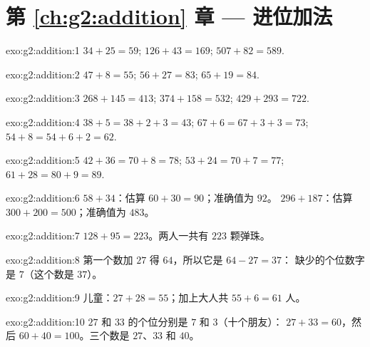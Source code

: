\section*{第 \ref{ch:g2:addition} 章 --- 进位加法}

\begin{solution}{exo:g2:addition:1}
$34 + 25 = 59$; \quad $126 + 43 = 169$; \quad $507 + 82 = 589$.
\end{solution}

\begin{solution}{exo:g2:addition:2}
$47 + 8 = 55$; \quad $56 + 27 = 83$; \quad $65 + 19 = 84$.
\end{solution}

\begin{solution}{exo:g2:addition:3}
$268 + 145 = 413$; \quad $374 + 158 = 532$; \quad
$429 + 293 = 722$.
\end{solution}

\begin{solution}{exo:g2:addition:4}
$38 + 5 = 38 + 2 + 3 = 43$; \quad $67 + 6 = 67 + 3 + 3 = 73$; \quad
$54 + 8 = 54 + 6 + 2 = 62$.
\end{solution}

\begin{solution}{exo:g2:addition:5}
$42 + 36 = 70 + 8 = 78$; \quad $53 + 24 = 70 + 7 = 77$; \quad
$61 + 28 = 80 + 9 = 89$.
\end{solution}

\begin{solution}{exo:g2:addition:6}
$58 + 34$：估算 $60 + 30 = 90$；准确值为 $92$。
$296 + 187$：估算 $300 + 200 = 500$；准确值为 $483$。
\end{solution}

\begin{solution}{exo:g2:addition:7}
$128 + 95 = 223$。两人一共有 $223$ 颗弹珠。
\end{solution}

\begin{solution}{exo:g2:addition:8}
第一个数加 $27$ 得 $64$，所以它是 $64 - 27 = 37$：
缺少的个位数字是 $7$（这个数是 $37$）。
\end{solution}

\begin{solution}{exo:g2:addition:9}
儿童：$27 + 28 = 55$；加上大人共 $55 + 6 = 61$
人。
\end{solution}

\begin{solution}{exo:g2:addition:10}
$27$ 和 $33$ 的个位分别是 $7$ 和 $3$（十个朋友）：
$27 + 33 = 60$，然后 $60 + 40 = 100$。三个数是
$27$、$33$ 和 $40$。
\end{solution}
